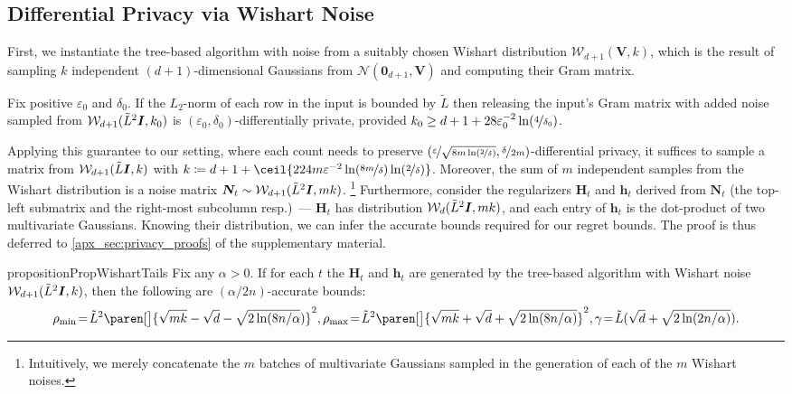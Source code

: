 \documentclass{article}
\renewcommand{\vec}[1]{\bm{#1}}
\newcommand{\defeq}{\coloneq}
\DeclarePairedDelimiter{\paren}()
\DeclarePairedDelimiter{\ceil}\lceil\rceil
\newcommand{\Wishart}{\mathcal{W}}
\newcommand{\Normal}{\mathcal{N}}
\newcommand{\Eye}[1][]{\bm{I}\notblank{#1}{_{{#1}\times{#1}}}{}}
\begin{document}
\subsection{Differential Privacy via Wishart Noise}
\label{sec:dp-wishart}

First, we instantiate the tree-based algorithm with noise from a
suitably chosen Wishart distribution $\Wishart_{d+1}(\vec V, k)$, which is the
result of sampling $k$ independent $(d+1)$-dimensional Gaussians from
$\Normal(\vec 0_{d+1}, \vec V)$ and computing their Gram
matrix.

\begin{theorem}%
  \label{thm:wishart-cont-dp}
  Fix positive $\varepsilon_0$ and $\delta_0$. If the $L_2$-norm of each
  row in the input is bounded by $\tilde L$ then releasing the input's
  Gram matrix with added noise sampled from
  $\Wishart_{d+1}(\tilde L^2 \Eye, k_0)$ is
  $(\varepsilon_0,\delta_0)$-differentially private, provided
  $k_0 \ge d + 1 + 28\varepsilon_0^{-2}\ln(\nicefrac{4}{\delta_0})$.
\end{theorem}
\vspace{-\parskip} Applying this guarantee to our setting, where each
count needs to preserve
$(\nicefrac{\varepsilon}{\sqrt{8m\ln(\nicefrac{2}{\delta})}},
\nicefrac{\delta}{2m})$-differential privacy, it suffices to sample a
matrix from $\Wishart_{d+1}(\tilde{L} \Eye, k)$ with
$k \defeq d + 1 + \ceil{224
  m\varepsilon^{-2}\ln(\nicefrac{8m}{\delta})\ln(\nicefrac{2}{\delta})}$.
Moreover, the sum of $m$ independent samples from the Wishart
distribution is a noise matrix
$\vec N_t\sim \Wishart_{d+1}(\tilde L^2\Eye, mk)$.%
\footnote{Intuitively, we merely concatenate the $m$ batches of
  multivariate Gaussians sampled in the generation of each of the $m$
  Wishart noises.} %
Furthermore, consider the regularizers $\vec H_t$ and $\vec h_t$ derived
from $\vec N_t$ (the top-left submatrix and the right-most subcolumn
resp.)~--- $\vec H_t$ has distribution
$\Wishart_d(\tilde L^2\Eye,mk)$, and each entry of $\vec h_t$ is the
dot-product of two multivariate Gaussians. Knowing their distribution,
we can infer the accurate bounds required for our regret bounds. The
proof is thus deferred to \cref{apx_sec:privacy_proofs} of the
supplementary material.
\begin{restatable}{proposition}{PropWishartTails}
\label{pro:accurate_bounds_for_Wishart}
Fix any $\alpha>0$. If for each $t$ the $\vec H_t$ and $\vec h_t$ are
generated by the tree-based algorithm with Wishart noise
$\Wishart_{d+1}(\tilde L^2 \Eye, k)$, then the following
are $(\alpha/2n)$-accurate bounds:
{\small
  \renewcommand\defeq{\!=\!}
  \begin{align*}
    \rho_{\min} \defeq \tilde L^2 \paren[\big]{\sqrt{mk}
                 - \sqrt{d} - \sqrt{2\ln(8n/\alpha})}^2,
    \rho_{\max} \defeq \tilde L^2 \paren[\big]{\sqrt{mk}
                 + \sqrt{d} + \sqrt{2\ln(8n/\alpha)}}^2,
    \gamma \defeq \tilde L(\sqrt{d} + \sqrt{2\ln(2n/\alpha)}).
 \end{align*}}
\end{restatable}
\end{document}
